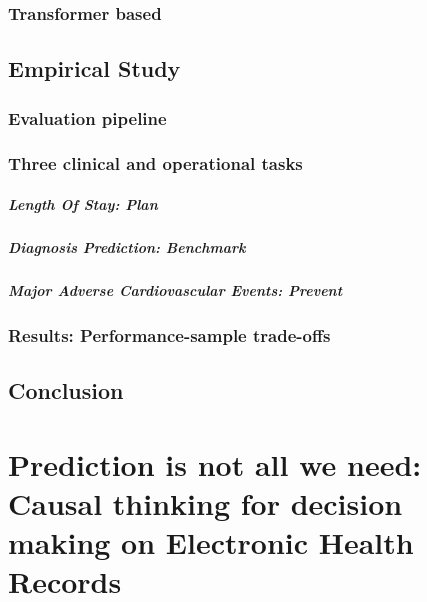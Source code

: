 \documentclass[french,12pt,twoside,a4paper]{book}
\begin{document}
\subsection{Transformer based}\label{subsec:predictive_models:transformer}

\section{Empirical Study}\label{sec:predictive_models:empirical_study}

\subsection{Evaluation pipeline}\label{subsec:predictive_models:evaluation_pipeline}

\subsection{Three clinical and operational tasks}\label{subsec:predictive_models:task_definitions}

\paragraph{Length Of Stay: Plan}

\paragraph{Diagnosis Prediction: Benchmark}

\paragraph{Major Adverse Cardiovascular Events: Prevent}

\subsection{Results: Performance-sample trade-offs}

\section{Conclusion}\label{sec:predictive_models:conclusion}

\chapter{Prediction is not all we need: Causal thinking for decision making on
  Electronic Health Records}\label{chapter:causal_tuto}
\end{document}
